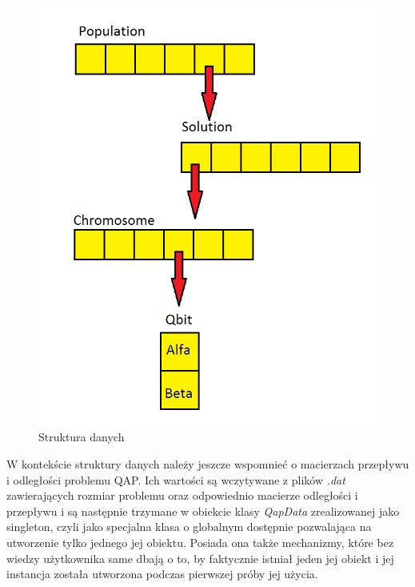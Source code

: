 \begin{figure}[!t]
\includegraphics[scale=0.4]{data_structure}
\caption{Struktura danych}
\end{figure}

W kontekście struktury danych należy jeszcze wspomnieć o macierzach przepływu i odległości problemu QAP. Ich wartości są wczytywane z plików \textit{.dat} zawierających rozmiar problemu oraz odpowiednio macierze odległości i przepływu i są następnie trzymane w obiekcie klasy \textit{QapData} zrealizowanej jako singleton, czyli jako specjalna klasa o globalnym dostępnie pozwalająca na utworzenie tylko jednego jej obiektu. Posiada ona także mechanizmy, które bez wiedzy użytkownika same dbają o to, by faktycznie istniał jeden jej obiekt i jej instancja została utworzona podczas pierwszej próby jej użycia.

